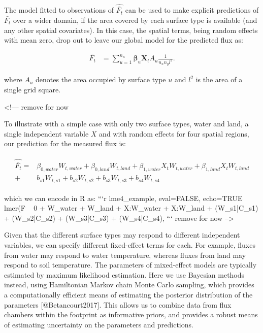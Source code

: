 The model fitted to observations of $\widehat{\bar{F_t}}$ can be used to make explicit predictions of $\bar{F_t}$ over a wider domain, if the area covered by each surface type is available (and any other spatial covariates). In this case, the spatial terms, being random effects with mean zero, drop out to leave our global model for the predicted flux as:

\begin{align}   \label{eq:pred_Fbar}
  \bar{F_t} &= \sum_{u = 1}^{n_u} \boldsymbol{\beta}_u \mathbf{X}_t A_{u} \frac{1}{n_x n_y l^2}.
\end{align}

where $A_{u}$ denotes the area occupied by surface type $u$ and $l^2$ is the area of a single grid square.

<!--- remove for now

To illustrate with a simple case with only two surface types, water and land, a single independent variable $X$ and with random effects for four spatial regions, our prediction for the measured flux is:

\begin{align}   \label{eq:lmerModel2}
\begin{split}
  \widehat{\bar{F_t}} =& \beta_{0,water} W_{t,water} + 
                         \beta_{0,land}  W_{t,land}  +
                         \beta_{1,water} X_{t} W_{t,water} +
                         \beta_{1,land}  X_{t} W_{t,land} \\
                       +& b_{s1} W_{t,s1} +
                          b_{s2} W_{t,s2} +
                          b_{s3} W_{t,s3} +
                          b_{s4} W_{t,s4}
\end{split}
\end{align}

which we can encode in R as:
```{r lme4_example, eval=FALSE, echo=TRUE}
lmer(F ~ 0 + W_water + W_land + X:W_water + X:W_land +
  (W_s1|C_s1) + (W_s2|C_s2) + (W_s3|C_s3) + (W_s4|C_s4),
```
      remove for now -->

Given that the different surface types may respond to different independent variables, we can specify different fixed-effect terms for each.  For example, fluxes from water may respond to water temperature, whereas fluxes from land may respond to soil temperature. The parameters of mixed-effect models are typically estimated by maximum likelihood estimation. Here we use Bayesian methods instead, using Hamiltonian Markov chain Monte Carlo sampling, which provides a computationally efficient means of estimating the posterior distribution of the parameters [@Betancourt2017]. This allows us to combine data from flux chambers within the footprint as informative priors, and provides a robust means of estimating uncertainty on the parameters and predictions.

